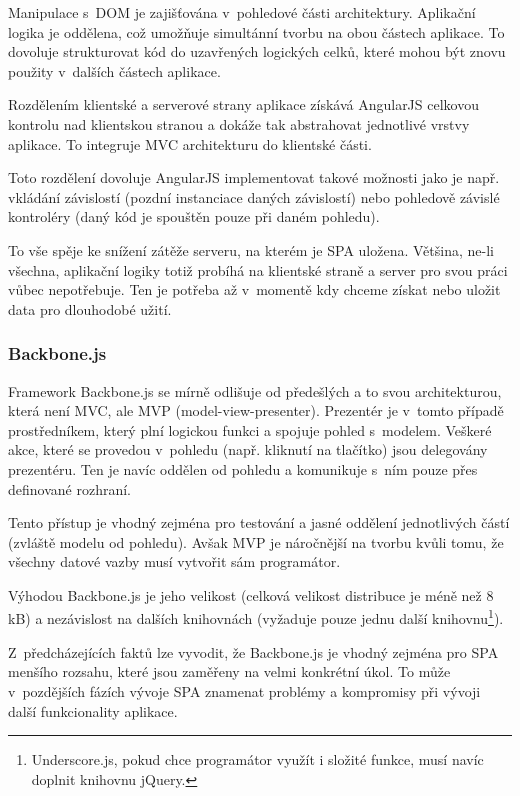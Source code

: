 Manipulace s~DOM je zajišťována v~pohledové části architektury. Aplikační logika je oddělena, což umožňuje simultánní tvorbu na obou částech aplikace. To dovoluje strukturovat kód do uzavřených logických celků, které mohou být znovu použity v~dalších částech aplikace.

Rozdělením klientské a serverové strany aplikace získává AngularJS celkovou kontrolu nad klientskou stranou a dokáže tak abstrahovat jednotlivé vrstvy aplikace. To integruje MVC architekturu do klientské části.

Toto rozdělení dovoluje AngularJS implementovat takové možnosti jako je např. vkládání závislostí (pozdní instanciace daných závislostí) nebo pohledově závislé kontroléry (daný kód je spouštěn pouze při daném pohledu).

To vše spěje ke snížení zátěže serveru, na kterém je SPA uložena. Většina, ne-li všechna, aplikační logiky totiž probíhá na klientské straně a server pro svou práci vůbec nepotřebuje. Ten je potřeba až v~momentě kdy chceme získat nebo uložit data pro dlouhodobé užití.

\subsubsection*{Backbone.js}

Framework Backbone.js se mírně odlišuje od předešlých a to svou architekturou, která není MVC, ale MVP (model-view-presenter). Prezentér je v~tomto případě prostředníkem, který plní logickou funkci a spojuje pohled s~modelem. Veškeré akce, které se provedou v~pohledu (např. kliknutí na tlačítko) jsou delegovány prezentéru. Ten je navíc oddělen od pohledu a komunikuje s~ním pouze přes definované rozhraní.

Tento přístup je vhodný zejména pro testování a jasné oddělení jednotlivých částí (zvláště modelu od pohledu). Avšak MVP je náročnější na tvorbu kvůli tomu, že všechny datové vazby musí vytvořit sám programátor.

Výhodou Backbone.js je jeho velikost (celková velikost distribuce je méně než 8 kB) a nezávislost na dalších knihovnách (vyžaduje pouze jednu další knihovnu\footnote{Underscore.js, pokud chce programátor využít i složité funkce, musí navíc doplnit knihovnu jQuery.}).

Z~předcházejících faktů lze vyvodit, že Backbone.js je vhodný zejména pro SPA menšího rozsahu, které jsou zaměřeny na velmi konkrétní úkol. To může v~pozdějších fázích vývoje SPA znamenat problémy a kompromisy při vývoji další funkcionality aplikace.

